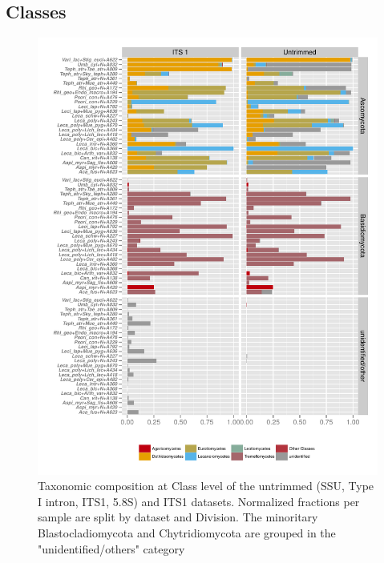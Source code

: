 \documentclass[a4paper, 11]{article}\usepackage[]{graphicx}\usepackage[]{color}
\makeatletter
\def\maxwidth{ %
  \ifdim\Gin@nat@width>\linewidth
    \linewidth
  \else
    \Gin@nat@width
  \fi
}
\newenvironment{knitrout}{}{} %
\makeatother
\begin{document}
\newpage
\subsection{Classes}
%
%
\begin{knitrout}
\color{fgcolor}\begin{figure}[H]
\includegraphics[width=\maxwidth]{figure/7_Class-1} \caption[Taxonomic composition at Class level of the untrimmed (SSU, Type I intron, ITS1, 5]{Taxonomic composition at Class level of the untrimmed (SSU, Type I intron, ITS1, 5.8S) and ITS1 datasets. Normalized fractions per sample are split by dataset and Division. The minoritary Blastocladiomycota and Chytridiomycota are grouped in the "unidentified/others" category }\label{fig:7_Class}
\end{figure}


\end{knitrout}
%
%
\end{document}
